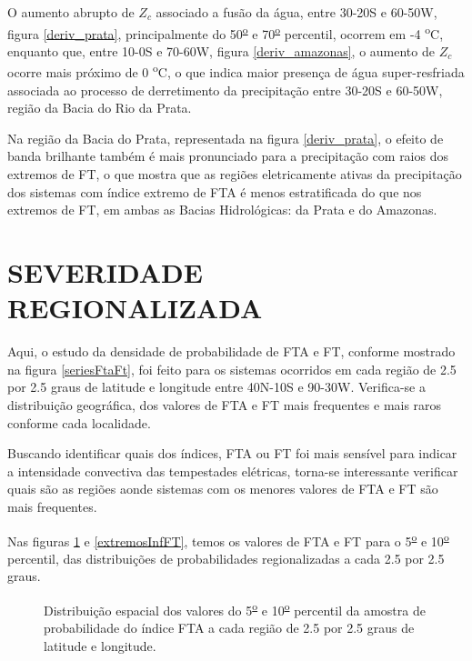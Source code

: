 O aumento abrupto de $Z_c$ associado a fusão da água, entre 30-20S e 60-50W, figura \ref{deriv_prata}, principalmente do 50\textsuperscript{\underline{o}} e 70\textsuperscript{\underline{o}} percentil, ocorrem em -4 \textsuperscript{o}C, enquanto que, entre 10-0S e 70-60W, figura \ref{deriv_amazonas}, o aumento de $Z_c$ ocorre mais próximo de 0 \textsuperscript{o}C, o que indica maior presença de água super-resfriada associada ao processo de derretimento da precipitação entre 30-20S e 60-50W, região da Bacia do Rio da Prata.  

Na região da Bacia do Prata, representada na figura \ref{deriv_prata}, o efeito de banda brilhante também é mais pronunciado para a precipitação com raios dos extremos de FT, o que mostra que as regiões eletricamente ativas da precipitação dos sistemas com índice extremo de FTA é menos estratificada do que nos extremos de FT, em ambas as Bacias Hidrológicas: da Prata e do Amazonas.

\newpage
\section{SEVERIDADE REGIONALIZADA}

Aqui, o estudo da densidade de probabilidade de FTA e FT, conforme mostrado na figura \ref{seriesFtaFt}, foi feito para os sistemas ocorridos em cada região de 2.5 por 2.5 graus de latitude e longitude entre 40N-10S e 90-30W. Verifica-se a distribuição geográfica, dos valores de FTA e FT mais frequentes e mais raros conforme cada localidade.

Buscando identificar quais dos índices, FTA ou FT foi mais sensível para indicar a intensidade convectiva das tempestades elétricas, torna-se interessante verificar quais são as regiões aonde sistemas com os menores valores de FTA e FT são mais frequentes.

Nas figuras \ref{extremosInfFTA} e \ref{extremosInfFT}, temos os valores de FTA e FT  para o 5\textsuperscript{\underline{o}} e 10\textsuperscript{\underline{o}} percentil, das distribuições de probabilidades regionalizadas a cada 2.5 por 2.5 graus.

\begin{figure}[!ht]
  \caption{Distribuição espacial dos valores do 5\textsuperscript{\underline{o}} e 10\textsuperscript{\underline{o}} percentil da amostra de probabilidade do índice FTA a cada região de 2.5 por 2.5 graus de latitude e longitude.}
\label{extremosInfFTA}
\end{figure} 


